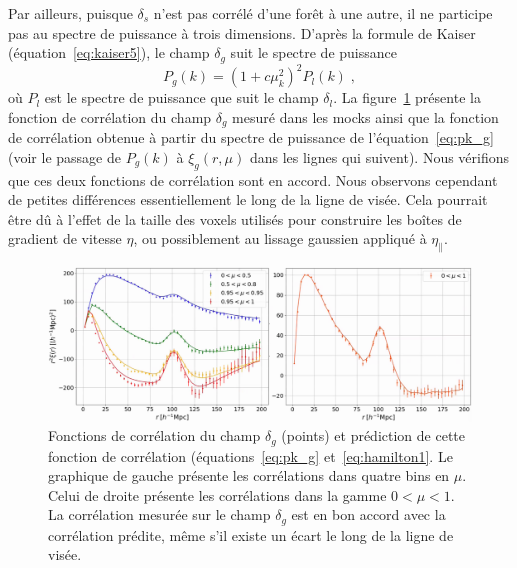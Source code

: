 Par ailleurs, puisque $\delta_s$ n'est pas corrélé d'une forêt à une autre, il ne participe pas au spectre de puissance à trois dimensions.
D'après la formule de Kaiser (équation~\ref{eq:kaiser5}), le champ $\delta_g$ suit le spectre de puissance
\begin{equation}
  \label{eq:pk_g}
    P_g(k) = (1 + c \mu_k^2)^2 P_l(k) \; ,
  \end{equation}
  où $P_l$ est le spectre de puissance que suit le champ $\delta_l$.
  La figure~\ref{fig:xi_g} présente la fonction de corrélation du champ $\delta_g$ mesuré dans les mocks ainsi que la fonction de corrélation obtenue à partir du spectre de puissance de l'équation~\ref{eq:pk_g} (voir le passage de $P_g(k)$ à $\xi_g(r,\mu)$ dans les lignes qui suivent). Nous vérifions que ces deux fonctions de corrélation sont en accord.
Nous observons cependant de petites différences essentiellement le long de la ligne de visée.
  Cela pourrait être dû à l'effet de la taille des voxels utilisés pour construire les boîtes de gradient de vitesse $\eta$, ou possiblement au lissage gaussien appliqué à $\eta_{\parallel}$.
  \begin{figure}
    \centering
    \includegraphics[scale=0.4]{xi_g}
    \caption{Fonctions de corrélation du champ $\delta_g$ (points) et prédiction de cette fonction de corrélation (équations~\ref{eq:pk_g} et~\ref{eq:hamilton1}. Le graphique de gauche présente les corrélations dans quatre bins en $\mu$. Celui de droite présente les corrélations dans la gamme $0 < \mu < 1$. La corrélation mesurée sur le champ $\delta_g$ est en bon accord avec la corrélation prédite, même s'il existe un écart le long de la ligne de visée.}
    \label{fig:xi_g}
  \end{figure}

